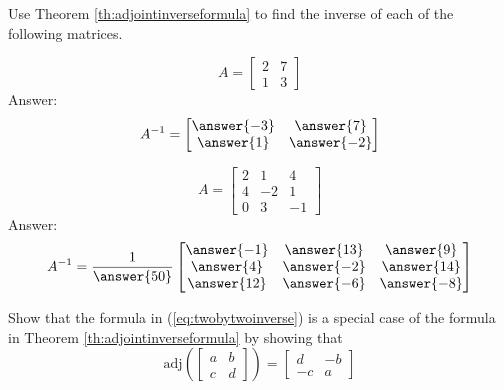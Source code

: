 \documentclass{ximera}
\begin{document}
\begin{problem}
Use Theorem \ref{th:adjointinverseformula} to find the inverse of each of the following matrices.
  \begin{problem}
  $$A=\begin{bmatrix}2&7\\1&3\end{bmatrix}$$
  Answer:
  $$A^{-1}=\begin{bmatrix}\answer{-3}&\answer{7}\\\answer{1}&\answer{-2}\end{bmatrix}$$
  \end{problem}
  
  \begin{problem}
  $$A=\begin{bmatrix}2&1&4\\4&-2&1\\0&3&-1\end{bmatrix}$$
  Answer:
  $$A^{-1}=\frac{1}{\answer{50}}\begin{bmatrix}\answer{-1}&\answer{13}&\answer{9}\\\answer{4}&\answer{-2}&\answer{14}\\\answer{12}&\answer{-6}&\answer{-8}\end{bmatrix}$$
  \end{problem}
\end{problem}

\begin{problem}
Show that the formula in (\ref{eq:twobytwoinverse}) is a special case of the formula in Theorem \ref{th:adjointinverseformula} by showing that 
$$\mbox{adj}\left(\begin{bmatrix}a&b\\c&d\end{bmatrix}\right)=\begin{bmatrix}d&-b\\-c&a\end{bmatrix}$$
\end{problem}
\end{document}
